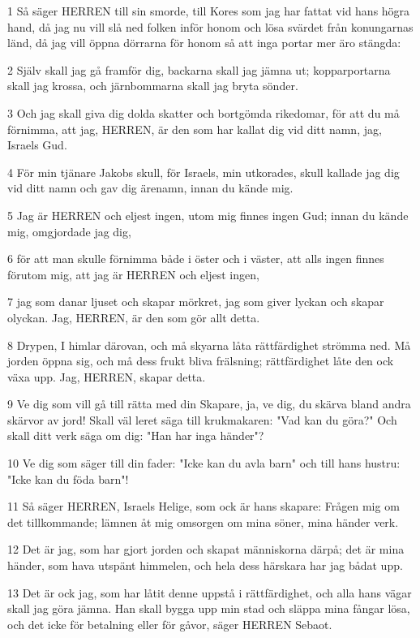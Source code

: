 \par 1 Så säger HERREN till sin smorde, till Kores som jag har fattat vid hans högra hand, då jag nu vill slå ned folken inför honom och lösa svärdet från konungarnas länd, då jag vill öppna dörrarna för honom så att inga portar mer äro stängda:
\par 2 Själv skall jag gå framför dig, backarna skall jag jämna ut; kopparportarna skall jag krossa, och järnbommarna skall jag bryta sönder.
\par 3 Och jag skall giva dig dolda skatter och bortgömda rikedomar, för att du må förnimma, att jag, HERREN, är den som har kallat dig vid ditt namn, jag, Israels Gud.
\par 4 För min tjänare Jakobs skull, för Israels, min utkorades, skull kallade jag dig vid ditt namn och gav dig ärenamn, innan du kände mig.
\par 5 Jag är HERREN och eljest ingen, utom mig finnes ingen Gud; innan du kände mig, omgjordade jag dig,
\par 6 för att man skulle förnimma både i öster och i väster, att alls ingen finnes förutom mig, att jag är HERREN och eljest ingen,
\par 7 jag som danar ljuset och skapar mörkret, jag som giver lyckan och skapar olyckan. Jag, HERREN, är den som gör allt detta.
\par 8 Drypen, I himlar därovan, och må skyarna låta rättfärdighet strömma ned. Må jorden öppna sig, och må dess frukt bliva frälsning; rättfärdighet låte den ock växa upp. Jag, HERREN, skapar detta.
\par 9 Ve dig som vill gå till rätta med din Skapare, ja, ve dig, du skärva bland andra skärvor av jord! Skall väl leret säga till krukmakaren: "Vad kan du göra?" Och skall ditt verk säga om dig: "Han har inga händer"?
\par 10 Ve dig som säger till din fader: "Icke kan du avla barn" och till hans hustru: "Icke kan du föda barn"!
\par 11 Så säger HERREN, Israels Helige, som ock är hans skapare: Frågen mig om det tillkommande; lämnen åt mig omsorgen om mina söner, mina händer verk.
\par 12 Det är jag, som har gjort jorden och skapat människorna därpå; det är mina händer, som hava utspänt himmelen, och hela dess härskara har jag bådat upp.
\par 13 Det är ock jag, som har låtit denne uppstå i rättfärdighet, och alla hans vägar skall jag göra jämna. Han skall bygga upp min stad och släppa mina fångar lösa, och det icke för betalning eller för gåvor, säger HERREN Sebaot.
